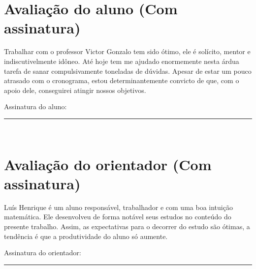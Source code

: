 \documentclass[12pt,twoside]{article}
\begin{document}

  \section{Avaliação do aluno (Com assinatura)}
    Trabalhar com o professor Victor Gonzalo tem sido ótimo, ele é solícito, mentor e indiscutivelmente idôneo. Até hoje tem me
    ajudado enormemente nesta árdua tarefa de sanar compulsivamente toneladas de dúvidas. Apesar de estar um pouco atrasado
    com o cronograma, estou determinantemente convicto de que, com o apoio dele, conseguirei atingir nossos objetivos.
    
    \vspace*{1cm} Assinatura do aluno: \ \rule{8cm}{1pt} \\
    

  \section{Avaliação do orientador (Com assinatura)}
    Luís Henrique é um aluno responsável, trabalhador e com uma boa intuição matemática. Ele desenvolveu de forma 
    notável seus estudos no conteúdo do presente trabalho. Assim, as expectativas para o decorrer do estudo são ótimas, 
    a tendência é que a produtividade do aluno só aumente. 
    
    \vspace*{1cm} Assinatura do orientador: \ \rule{8cm}{1pt} \\
    

  \thispagestyle{empty} %
\end{document}
